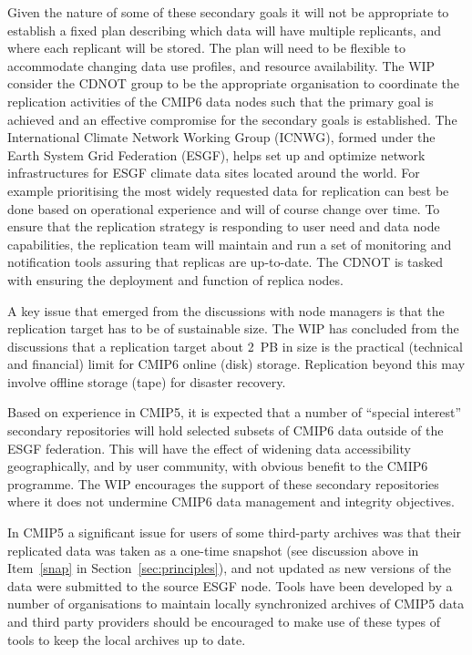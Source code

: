 \documentclass[gmd,manuscript]{copernicus}
\newcommand{\secref}[1] {\mbox{Section  \ref{sec:#1}}}
\begin{document}
Given the nature of some of these secondary goals it will not be
appropriate to establish a fixed plan describing which data will have
multiple replicants, and where each replicant will be stored. The plan
will need to be flexible to accommodate changing data use profiles,
and resource availability. The WIP consider the CDNOT group to be the
appropriate organisation to coordinate the replication activities of
the CMIP6 data nodes such that the primary goal is achieved and an
effective compromise for the secondary goals is established. The
International Climate Network Working Group (ICNWG), formed under the
Earth System Grid Federation (ESGF), helps set up and optimize network
infrastructures for ESGF climate data sites located around the world.
For example prioritising the most widely requested data for
replication can best be done based on operational experience and will
of course change over time. To ensure that the replication strategy is
responding to user need and data node capabilities, the replication
team will maintain and run a set of monitoring and notification tools
assuring that replicas are up-to-date. The CDNOT is tasked with
ensuring the deployment and function of replica nodes.

A key issue that emerged from the discussions with node managers is
that the replication target has to be of sustainable size. The WIP has
concluded from the discussions that a replication target about 2~PB in
size is the practical (technical and financial) limit for CMIP6 online
(disk) storage. Replication beyond this may involve offline storage
(tape) for disaster recovery.

Based on experience in CMIP5, it is expected that a number of
``special interest'' secondary repositories will hold selected subsets
of CMIP6 data outside of the ESGF federation. This will have the
effect of widening data accessibility geographically, and by user
community, with obvious benefit to the CMIP6 programme. The WIP
encourages the support of these secondary repositories where it
does not undermine CMIP6 data management and integrity objectives.

In CMIP5 a significant issue for users of some third-party archives
was that their replicated data was taken as a one-time snapshot (see
discussion above in Item~\ref{snap} in \secref{principles}), and not
updated as new versions of the data were submitted to the source ESGF
node. Tools have been developed by a number of organisations to
maintain locally synchronized archives of CMIP5 data and third party
providers should be encouraged to make use of these types of tools to
keep the local archives up to date.
\end{document}
